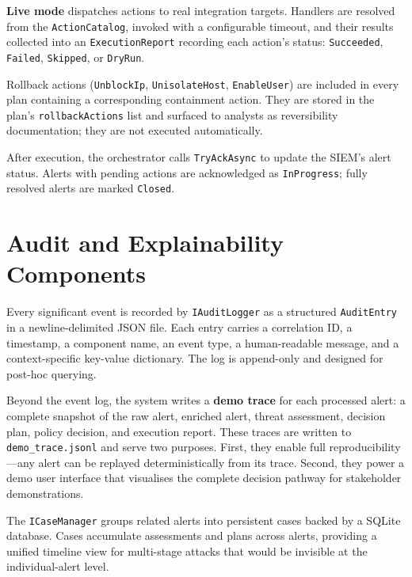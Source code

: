 \textbf{Live mode} dispatches actions to real integration targets. Handlers are resolved
from the \texttt{ActionCatalog}, invoked with a configurable timeout, and their results
collected into an \texttt{ExecutionReport} recording each action's status:
\texttt{Succeeded}, \texttt{Failed}, \texttt{Skipped}, or \texttt{DryRun}.

Rollback actions (\texttt{UnblockIp}, \texttt{UnisolateHost}, \texttt{EnableUser}) are
included in every plan containing a corresponding containment action. They are stored
in the plan's \texttt{rollbackActions} list and surfaced to analysts as reversibility
documentation; they are not executed automatically.

After execution, the orchestrator calls \texttt{TryAckAsync} to update the SIEM's
alert status. Alerts with pending actions are acknowledged as \texttt{InProgress};
fully resolved alerts are marked \texttt{Closed}.

\section{Audit and Explainability Components}

Every significant event is recorded by \texttt{IAuditLogger} as a structured
\texttt{AuditEntry} in a newline-delimited JSON file. Each entry carries a correlation
ID, a timestamp, a component name, an event type, a human-readable message, and a
context-specific key-value dictionary. The log is append-only and designed for
post-hoc querying.

Beyond the event log, the system writes a \textbf{demo trace} for each processed alert:
a complete snapshot of the raw alert, enriched alert, threat assessment, decision plan,
policy decision, and execution report. These traces are written to \texttt{demo\_trace.jsonl}
and serve two purposes. First, they enable full reproducibility---any alert can be
replayed deterministically from its trace. Second, they power a demo user interface that
visualises the complete decision pathway for stakeholder demonstrations.

The \texttt{ICaseManager} groups related alerts into persistent cases backed by a SQLite
database. Cases accumulate assessments and plans across alerts, providing a unified
timeline view for multi-stage attacks that would be invisible at the individual-alert level.


